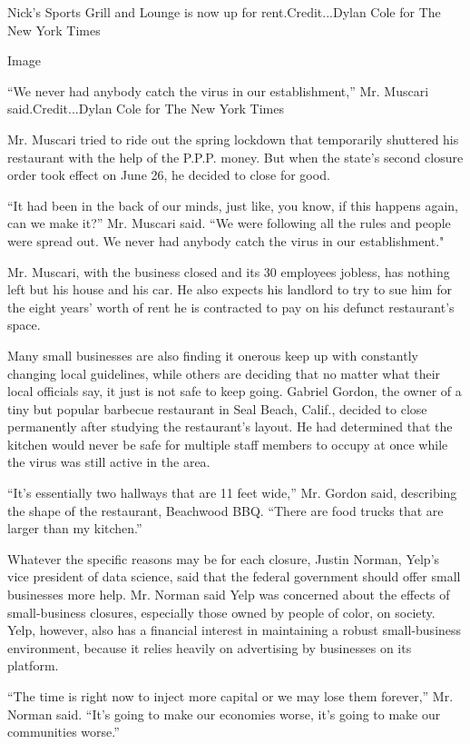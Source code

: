 Nick's Sports Grill and Lounge is now up for rent.Credit...Dylan Cole
for The New York Times

Image

``We never had anybody catch the virus in our establishment,'' Mr.
Muscari said.Credit...Dylan Cole for The New York Times

Mr. Muscari tried to ride out the spring lockdown that temporarily
shuttered his restaurant with the help of the P.P.P. money. But when the
state's second closure order took effect on June 26, he decided to close
for good.

``It had been in the back of our minds, just like, you know, if this
happens again, can we make it?'' Mr. Muscari said. ``We were following
all the rules and people were spread out. We never had anybody catch the
virus in our establishment."

Mr. Muscari, with the business closed and its 30 employees jobless, has
nothing left but his house and his car. He also expects his landlord to
try to sue him for the eight years' worth of rent he is contracted to
pay on his defunct restaurant's space.

Many small businesses are also finding it onerous keep up with
constantly changing local guidelines, while others are deciding that no
matter what their local officials say, it just is not safe to keep
going. Gabriel Gordon, the owner of a tiny but popular barbecue
restaurant in Seal Beach, Calif., decided to close permanently after
studying the restaurant's layout. He had determined that the kitchen
would never be safe for multiple staff members to occupy at once while
the virus was still active in the area.

``It's essentially two hallways that are 11 feet wide,'' Mr. Gordon
said, describing the shape of the restaurant, Beachwood BBQ. ``There are
food trucks that are larger than my kitchen.''

Whatever the specific reasons may be for each closure, Justin Norman,
Yelp's vice president of data science, said that the federal government
should offer small businesses more help. Mr. Norman said Yelp was
concerned about the effects of small-business closures, especially those
owned by people of color, on society. Yelp, however, also has a
financial interest in maintaining a robust small-business environment,
because it relies heavily on advertising by businesses on its platform.

``The time is right now to inject more capital or we may lose them
forever,'' Mr. Norman said. ``It's going to make our economies worse,
it's going to make our communities worse.''

